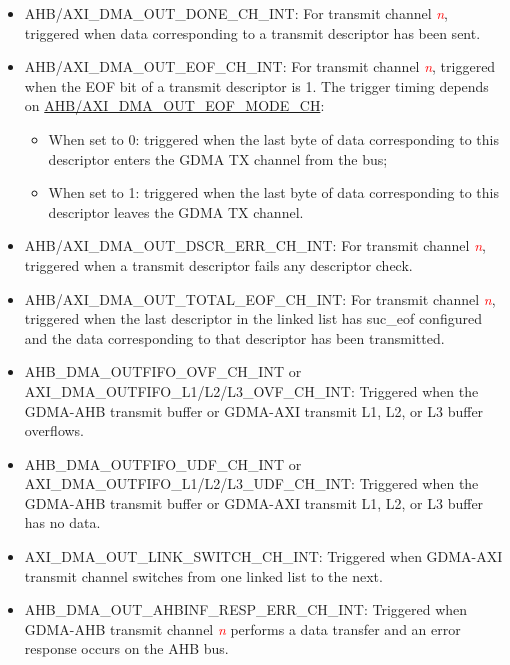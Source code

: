 \documentclass[main\_\_EN.tex]{subfiles}
\begin{document}
\begin{itemize}
    \item \label{int:GDMAOUTDONEINT}AHB/AXI\_DMA\_OUT\_DONE\_CH\_INT: For transmit channel \textcolor{red}{\it{n}}, triggered when data corresponding to a transmit descriptor has been sent.
    \item \label{int:GDMAOUTEOFINT}AHB/AXI\_DMA\_OUT\_EOF\_CH\_INT: For transmit channel \textcolor{red}{\it{n}}, triggered when the EOF bit of a transmit descriptor is 1. The trigger timing depends on \hyperref[fielddesc:AHBDMAOUTEOFMODECHN]{AHB/AXI\_DMA\_OUT\_EOF\_MODE\_CH}:
        \begin{itemize}
            \item When set to 0: triggered when the last byte of data corresponding to this descriptor enters the GDMA TX channel from the bus;
            \item When set to 1: triggered when the last byte of data corresponding to this descriptor leaves the GDMA TX channel.
        \end{itemize}
    \item \label{int:GDMAOUTDSCRERRINT}AHB/AXI\_DMA\_OUT\_DSCR\_ERR\_CH\_INT: For transmit channel \textcolor{red}{\it{n}}, triggered when a transmit descriptor fails any descriptor check.
    \item \label{int:GDMAOUTTOTALEOFINT}AHB/AXI\_DMA\_OUT\_TOTAL\_EOF\_CH\_INT: For transmit channel \textcolor{red}{\it{n}}, triggered when the last descriptor in the linked list has suc\_eof configured and the data corresponding to that descriptor has been transmitted.
    \item \label{int:GDMAOUTFIFOOVFINT}AHB\_DMA\_OUTFIFO\_OVF\_CH\_INT or AXI\_DMA\_OUTFIFO\_L1/L2/L3\_OVF\_CH\_INT: Triggered when the GDMA-AHB transmit buffer or GDMA-AXI transmit L1, L2, or L3 buffer overflows.
    \item \label{int:GDMAOUTFIFOUDFINT}AHB\_DMA\_OUTFIFO\_UDF\_CH\_INT or AXI\_DMA\_OUTFIFO\_L1/L2/L3\_UDF\_CH\_INT: Triggered when the GDMA-AHB transmit buffer or GDMA-AXI transmit L1, L2, or L3 buffer has no data.
    \item \label{int:AXIDMAOUTLINKSWITCHINT}AXI\_DMA\_OUT\_LINK\_SWITCH\_CH\_INT: Triggered when GDMA-AXI transmit channel  switches from one linked list to the next.
    \item \label{int:GDMAOUTAHBINFRESPERRINT}AHB\_DMA\_OUT\_AHBINF\_RESP\_ERR\_CH\_INT: Triggered when GDMA-AHB transmit channel \textcolor{red}{\it{n}} performs a data transfer and an error response occurs on the AHB bus.
\end{itemize}
\end{document}
